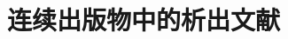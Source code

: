 \section{连续出版物中的析出文献}

\numerical

\nocite{yxl, yjb, lbm, lyp, wll, kanamori, caplan, frese, myburg}



